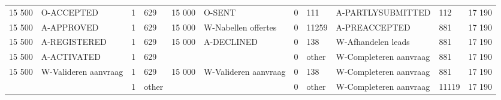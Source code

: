 \begin{tabular}{llllllllllr}
15 500 & O-ACCEPTED & 1 & 629 & 15 000 & O-SENT & 0 & 111 & A-PARTLYSUBMITTED & 112 & 17 190 \\
15 500 & A-APPROVED & 1 & 629 & 15 000 & W-Nabellen offertes & 0 & 11259 & A-PREACCEPTED & 881 & 17 190 \\
15 500 & A-REGISTERED & 1 & 629 & 15 000 & A-DECLINED & 0 & 138 & W-Afhandelen leads & 881 & 17 190 \\
15 500 & A-ACTIVATED & 1 & 629 &  &  & 0 & other & W-Completeren aanvraag & 881 & 17 190 \\
15 500 & W-Valideren aanvraag & 1 & 629 & 15 000 & W-Valideren aanvraag & 0 & 138 & W-Completeren aanvraag & 881 & 17 190 \\
 &  & 1 & other &  &  & 0 & other & W-Completeren aanvraag & 11119 & 17 190 \\
\bottomrule
\end{tabular}
